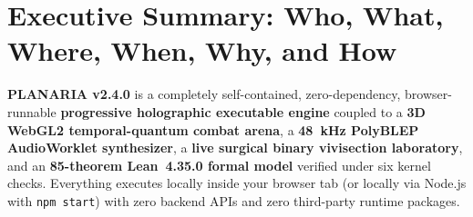 \documentclass[10pt,letterpaper]{article}
\begin{document}
\newpage
{}

\section*{Executive Summary: Who, What, Where, When, Why, and How}
\label{sec:exec}

\textbf{PLANARIA v2.4.0} is a completely self-contained, zero-dependency, browser-runnable \textbf{progressive holographic executable engine} coupled to a \textbf{3D WebGL2 temporal-quantum combat arena}, a \textbf{48~kHz PolyBLEP AudioWorklet synthesizer}, a \textbf{live surgical binary vivisection laboratory}, and an \textbf{85-theorem Lean~4.35.0 formal model} verified under six kernel checks. Everything executes locally inside your browser tab (or locally via Node.js with \texttt{npm start}) with zero backend APIs and zero third-party runtime packages.
\end{document}
